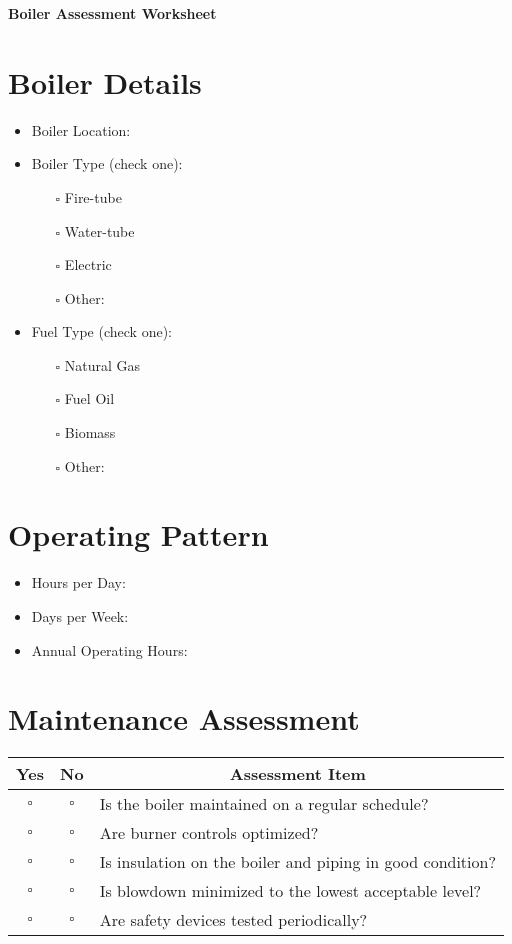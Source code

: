 \documentclass[./main.tex]{subfiles}
\begin{document}
\begin{center}
\Large\textbf{Boiler Assessment Worksheet}
\end{center}

\section*{Boiler Details}
\begin{itemize}
    \item Boiler Location: \hrulefill
    \item Boiler Type (check one):
    \begin{itemize}
        \item[$\square$] Fire-tube
        \item[$\square$] Water-tube
        \item[$\square$] Electric
        \item[$\square$] Other: \hrulefill
    \end{itemize}
    \item Fuel Type (check one):
    \begin{itemize}
        \item[$\square$] Natural Gas
        \item[$\square$] Fuel Oil
        \item[$\square$] Biomass
        \item[$\square$] Other: \hrulefill
    \end{itemize}
\end{itemize}

\section*{Operating Pattern}
\begin{itemize}
    \item Hours per Day: \hrulefill
    \item Days per Week: \hrulefill
    \item Annual Operating Hours: \hrulefill
\end{itemize}

\section*{Maintenance Assessment}
\begin{tabular}{|c|c|p{14cm}|}
\hline
\multicolumn{1}{|c|}{\textbf{Yes}} & \multicolumn{1}{c|}{\textbf{No}} & \multicolumn{1}{c|}{\textbf{Assessment Item}} \\
\hline
$\square$ & $\square$ & Is the boiler maintained on a regular schedule? \\
\hline
$\square$ & $\square$ & Are burner controls optimized? \\
\hline
$\square$ & $\square$ & Is insulation on the boiler and piping in good condition? \\
\hline
$\square$ & $\square$ & Is blowdown minimized to the lowest acceptable level? \\
\hline
$\square$ & $\square$ & Are safety devices tested periodically? \\
\hline
\end{tabular}
\end{document}
